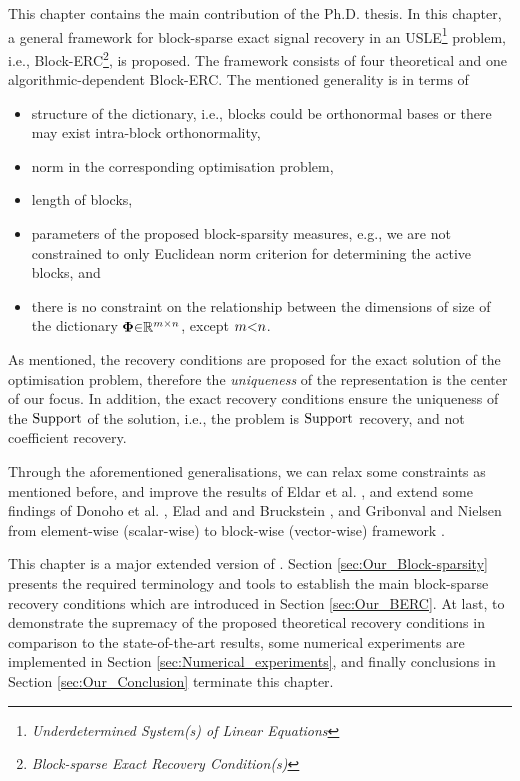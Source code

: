 This chapter contains the main contribution of the Ph.D. thesis.
In this chapter, a general framework for block-sparse exact signal recovery in an USLE\footnote{\emph{Underdetermined System(s) of Linear Equations}} problem, i.e., Block-ERC\footnote{\emph{Block-sparse Exact Recovery Condition(s)}}, is proposed.
The framework consists of four theoretical and one algorithmic-dependent Block-ERC.
\newpage
The mentioned generality is in terms of 
\begin{itemize}
\item structure of the dictionary, i.e., 
blocks could be orthonormal bases or there may exist intra-block orthonormality, 
\item norm in the corresponding optimisation problem,
\item length of blocks,
\item parameters of the proposed block-sparsity measures, e.g., we are not constrained to only Euclidean norm criterion for determining the active blocks, and
\item there is no constraint on the relationship between the dimensions of size of the dictionary $\boldsymbol{\Phi} {\in} \mathbb{R}^{m {\times} n}$, except $m {<} n$.
\end{itemize}

As mentioned, the recovery conditions are proposed for the exact solution of the optimisation problem, therefore the \emph{uniqueness} of the representation is the center of our focus. 
In addition, the exact recovery conditions ensure the uniqueness of the $\mathrm{Support}$ of the solution, i.e., the problem is $\mathrm{Support}$ recovery, and not coefficient recovery.

Through the aforementioned generalisations, we can relax some constraints as mentioned before, and improve the results of Eldar et al. \cite{Eldar2009b,Eldar2010b,Eldar2010}, and extend some findings of Donoho et al. \cite{Donoho2001,Donoho2003}, Elad and and Bruckstein \cite{Elad2001,Elad2002a}, and Gribonval and Nielsen \cite{Gribonval2003a,Gribonval2003} from element-wise (scalar-wise) to block-wise (vector-wise) framework \cite{Afdideh2016}.

This chapter is a major extended version of \cite{Afdideh2016}.
Section \ref{sec:Our_Block-sparsity} presents the required terminology and tools to establish the main block-sparse recovery conditions which are introduced in Section \ref{sec:Our_BERC}.
At last, to demonstrate the supremacy of the proposed theoretical recovery conditions in comparison to the state-of-the-art results, some numerical experiments are implemented in Section \ref{sec:Numerical_experiments}, and finally conclusions in Section \ref{sec:Our_Conclusion} terminate this chapter.